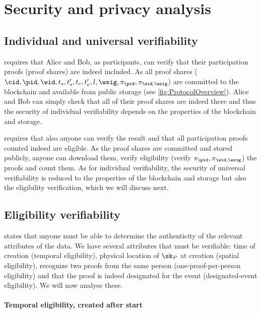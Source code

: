 \section{Security and privacy analysis}%
\label{SecurityAnalysis}

\subsection{Individual and universal verifiability}%
\label{analysis-individual}%
\label{analysis-universal}

 requires that Alice and Bob, as participants, can verify 
that their participation proofs (proof shares) are indeed included.
As all proof shares (\ie \(\cid, \pid, \wid, t_s, t_s', t_e, t_e', l, \wsig, 
  \pi_\pid, \pi_{\wid, \wsig}\)) are committed to the blockchain and available 
from public storage (see \cref{fig:ProtocolOverview}).
Alice and Bob can simply check that all of their proof shares are indeed there 
and thus the security of individual verifiability depends on the properties of 
the blockchain and storage.

 requires that also anyone can verify the result and that 
all participation proofs counted indeed are eligible.
As the proof shares are committed and stored publicly, anyone can download them, 
verify eligibility (\ie verify \(\pi_\pid, \pi_{\wid, \wsig}\)) the proofs and 
count them.
As for individual verifiability, the security of universal verifiability is 
reduced to the properties of the blockchain and storage but also the eligibility 
verification, which we will discuss next.

\subsection{Eligibility verifiability}%
\label{analysis-eligibility}

 states that anyone must be able to determine the 
authenticity of the relevant attributes of the data.
We have several attributes that must be verifiable:
time of creation (temporal eligibility),
physical location of \(\sk_P\) at creation (spatial eligibility),
recognize two proofs from the same person (one-proof-per-person eligibility) and 
that the proof is indeed designated for the event (designated-event 
eligibility).
We will now analyse these.

\paragraph{Temporal eligibility, created after start}

